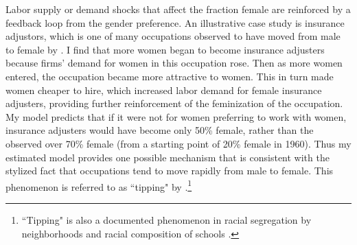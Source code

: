 \documentclass[12pt]{article}
\begin{document}

Labor supply or demand shocks that affect the fraction female are reinforced by a feedback loop from the gender preference. An illustrative case study is insurance adjustors, which is one of many occupations observed to have moved from male to female by . I find that more women began to become insurance adjusters because firms' demand for women in this occupation rose. Then as more women entered, the occupation became more attractive to women. This in turn made women cheaper to hire, which increased labor demand for female insurance adjusters, providing further reinforcement of the feminization of the occupation. My model predicts that if it were not for women preferring to work with women, insurance adjusters would have become only 50\% female, rather than the observed over 70\% female (from a starting point of 20\% female in 1960). Thus my estimated model provides one possible mechanism that is consistent with the stylized fact that occupations tend to move rapidly from male to female. This phenomenon is referred to as ``tipping" by .\footnote{``Tipping" is also a documented phenomenon in racial segregation by neighborhoods \cite{Card2008} and racial composition of schools \cite{Caetano2017}.}



\end{document}
